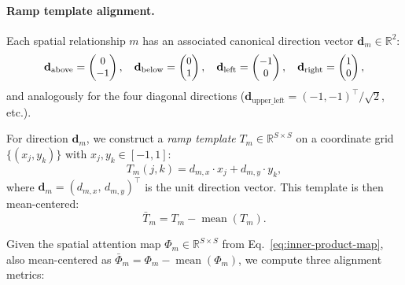 \paragraph{Ramp template alignment.}
Each spatial relationship $m$ has an associated canonical direction vector $\mathbf{d}_m \in \mathbb{R}^2$:
\begin{equation}
\small
    \mathbf{d}_{\text{above}} = \begin{pmatrix} 0 \\ -1 \end{pmatrix}, \quad
    \mathbf{d}_{\text{below}} = \begin{pmatrix} 0 \\ 1 \end{pmatrix}, \quad
    \mathbf{d}_{\text{left}} = \begin{pmatrix} -1 \\ 0 \end{pmatrix}, \quad
    \mathbf{d}_{\text{right}} = \begin{pmatrix} 1 \\ 0 \end{pmatrix},
\end{equation}
and analogously for the four diagonal directions ($\mathbf{d}_{\text{upper\_left}} = (-1, -1)^\top / \sqrt{2}$, etc.).

For direction $\mathbf{d}_m$, we construct a \emph{ramp template} $T_m \in \mathbb{R}^{S \times S}$ on a coordinate grid $\{(x_j, y_k)\}$ with $x_j, y_k \in [-1, 1]$:
\begin{equation}
    T_m(j,k) = d_{m,x} \cdot x_j + d_{m,y} \cdot y_k,
\end{equation}
where $\mathbf{d}_m = (d_{m,x},\, d_{m,y})^\top$ is the unit direction vector. This template is then mean-centered:
\begin{equation}
    \bar{T}_m = T_m - \operatorname{mean}(T_m).
\end{equation}

Given the spatial attention map $\Phi_m \in \mathbb{R}^{S \times S}$ from Eq.~\eqref{eq:inner-product-map}, also mean-centered as $\bar{\Phi}_m = \Phi_m - \operatorname{mean}(\Phi_m)$, we compute three alignment metrics:

